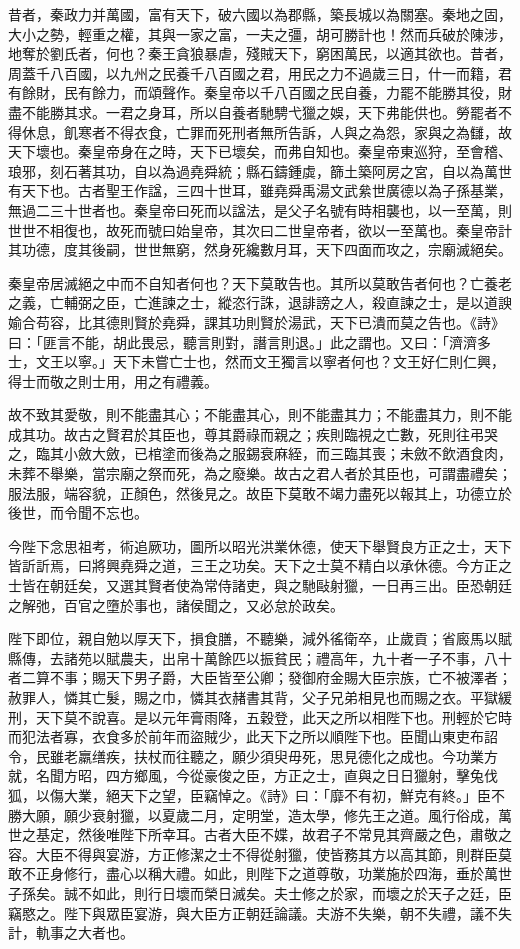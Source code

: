 \begin{pinyinscope}
昔者，秦政力并萬國，富有天下，破六國以為郡縣，築長城以為關塞。秦地之固，大小之勢，輕重之權，其與一家之富，一夫之彊，胡可勝計也！然而兵破於陳涉，地奪於劉氏者，何也？秦王貪狼暴虐，殘賊天下，窮困萬民，以適其欲也。昔者，周蓋千八百國，以九州之民養千八百國之君，用民之力不過歲三日，什一而籍，君有餘財，民有餘力，而頌聲作。秦皇帝以千八百國之民自養，力罷不能勝其役，財盡不能勝其求。一君之身耳，所以自養者馳騁弋獵之娛，天下弗能供也。勞罷者不得休息，飢寒者不得衣食，亡罪而死刑者無所告訴，人與之為怨，家與之為讎，故天下壞也。秦皇帝身在之時，天下已壞矣，而弗自知也。秦皇帝東巡狩，至會稽、琅邪，刻石著其功，自以為過堯舜統；縣石鑄鍾虡，篩土築阿房之宮，自以為萬世有天下也。古者聖王作諡，三四十世耳，雖堯舜禹湯文武絫世廣德以為子孫基業，無過二三十世者也。秦皇帝曰死而以諡法，是父子名號有時相襲也，以一至萬，則世世不相復也，故死而號曰始皇帝，其次曰二世皇帝者，欲以一至萬也。秦皇帝計其功德，度其後嗣，世世無窮，然身死纔數月耳，天下四面而攻之，宗廟滅絕矣。

秦皇帝居滅絕之中而不自知者何也？天下莫敢告也。其所以莫敢告者何也？亡養老之義，亡輔弼之臣，亡進諫之士，縱恣行誅，退誹謗之人，殺直諫之士，是以道諛媮合苟容，比其德則賢於堯舜，課其功則賢於湯武，天下已潰而莫之告也。《詩》曰：「匪言不能，胡此畏忌，聽言則對，譖言則退。」此之謂也。又曰：「濟濟多士，文王以寧。」天下未嘗亡士也，然而文王獨言以寧者何也？文王好仁則仁興，得士而敬之則士用，用之有禮義。

故不致其愛敬，則不能盡其心；不能盡其心，則不能盡其力；不能盡其力，則不能成其功。故古之賢君於其臣也，尊其爵祿而親之；疾則臨視之亡數，死則往弔哭之，臨其小斂大斂，已棺塗而後為之服錫衰麻絰，而三臨其喪；未斂不飲酒食肉，未葬不舉樂，當宗廟之祭而死，為之廢樂。故古之君人者於其臣也，可謂盡禮矣；服法服，端容貌，正顏色，然後見之。故臣下莫敢不竭力盡死以報其上，功德立於後世，而令聞不忘也。

今陛下念思祖考，術追厥功，圖所以昭光洪業休德，使天下舉賢良方正之士，天下皆訢訢焉，曰將興堯舜之道，三王之功矣。天下之士莫不精白以承休德。今方正之士皆在朝廷矣，又選其賢者使為常侍諸吏，與之馳敺射獵，一日再三出。臣恐朝廷之解弛，百官之墮於事也，諸侯聞之，又必怠於政矣。

陛下即位，親自勉以厚天下，損食膳，不聽樂，減外徭衛卒，止歲貢；省廄馬以賦縣傳，去諸苑以賦農夫，出帛十萬餘匹以振貧民；禮高年，九十者一子不事，八十者二算不事；賜天下男子爵，大臣皆至公卿；發御府金賜大臣宗族，亡不被澤者；赦罪人，憐其亡髮，賜之巾，憐其衣赭書其背，父子兄弟相見也而賜之衣。平獄緩刑，天下莫不說喜。是以元年膏雨降，五穀登，此天之所以相陛下也。刑輕於它時而犯法者寡，衣食多於前年而盜賊少，此天下之所以順陛下也。臣聞山東吏布詔令，民雖老羸缮疾，扶杖而往聽之，願少須臾毋死，思見德化之成也。今功業方就，名聞方昭，四方鄉風，今從豪俊之臣，方正之士，直與之日日獵射，擊兔伐狐，以傷大業，絕天下之望，臣竊悼之。《詩》曰：「靡不有初，鮮克有終。」臣不勝大願，願少衰射獵，以夏歲二月，定明堂，造太學，修先王之道。風行俗成，萬世之基定，然後唯陛下所幸耳。古者大臣不媟，故君子不常見其齊嚴之色，肅敬之容。大臣不得與宴游，方正修潔之士不得從射獵，使皆務其方以高其節，則群臣莫敢不正身修行，盡心以稱大禮。如此，則陛下之道尊敬，功業施於四海，垂於萬世子孫矣。誠不如此，則行日壞而榮日滅矣。夫士修之於家，而壞之於天子之廷，臣竊愍之。陛下與眾臣宴游，與大臣方正朝廷論議。夫游不失樂，朝不失禮，議不失計，軌事之大者也。


\end{pinyinscope}
